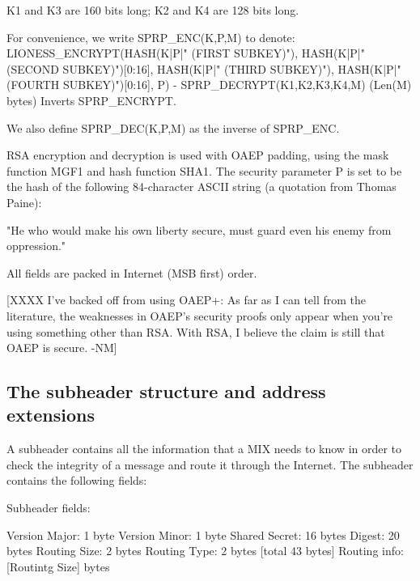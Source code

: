   K1 and K3 are 160 bits long; K2 and K4 are 128 bits long.

  For convenience, we write SPRP_ENC(K,P,M) to denote:
       LIONESS_ENCRYPT(HASH(K|P|" (FIRST SUBKEY)"),
                       HASH(K|P|" (SECOND SUBKEY)")[0:16],
 	               HASH(K|P|" (THIRD SUBKEY)"),
 	               HASH(K|P|" (FOURTH SUBKEY)")[0:16], P)
- SPRP_DECRYPT(K1,K2,K3,K4,M) (Len(M) bytes) Inverts SPRP_ENCRYPT.

  We also define SPRP_DEC(K,P,M) as the inverse of SPRP_ENC.
    
RSA encryption and decryption is used with OAEP padding, using the 
mask function MGF1 and hash function SHA1.  The security
parameter P is set to be the hash of the following 84-character ASCII
string (a quotation from Thomas Paine): 

     "He who would make his own liberty secure, must guard even his
      enemy from oppression." 

All fields are packed in Internet (MSB first) order.

[XXXX I've backed off from using OAEP+: As far as I can tell from the
      literature, the weaknesses in OAEP's security proofs only appear
      when you're using something other than RSA.  With RSA, I believe
      the claim is still that OAEP is secure. -NM]

\subsection{The subheader structure and address extensions}

A subheader contains all the information that a MIX needs to know
in order to check the integrity of a message and route it through the
Internet. The subheader contains the following fields: 

Subheader fields:

Version Major:   1 byte
Version Minor:   1 byte
Shared Secret:   16 bytes
Digest:          20 bytes
Routing Size:    2 bytes
Routing Type:    2 bytes  [total 43 bytes]
Routing info:    [Routintg Size] bytes

